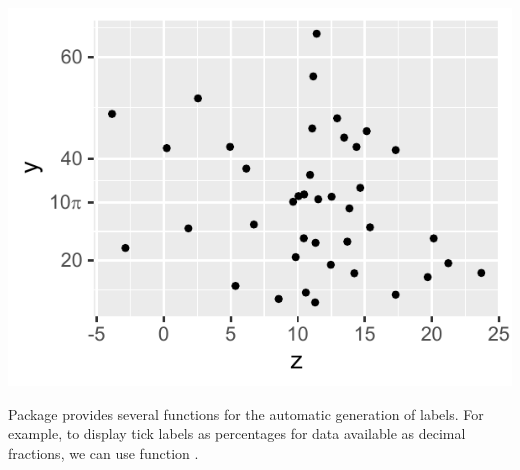 \documentclass[krantz2]{krantz}\usepackage{knitr}
\begin{document}
\begin{knitrout}\footnotesize
{}\color{fgcolor}\begin{kframe}
\begin{alltt}
  \hlopt{+}
  \hlstd{()} \hlopt{+}
  \hlstd{(} \hlstd{=} \hlstd{(} \hlopt{*} \hlstd{,} \hlstd{,} \hlstd{),}
                      \hlstd{=} \hlstd{(}\hlstd{,} \hlstd{(}\hlopt{*} \hlstd{,} \hlstd{))}
\end{alltt}
\end{kframe}

{\centering \includegraphics[width=.54\textwidth]{figure/pos-scale-ticks-02-1} 

}



\end{knitrout}

Package  provides several functions for the automatic generation of labels. For example, to display tick labels as percentages for data available as decimal fractions, we can use function .
\end{document}
